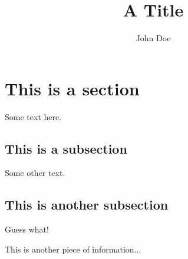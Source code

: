 \documentclass{article}
\title{A Title}
\author{John Doe}
\begin{document}
\maketitle

\section{This is a section}

Some text here.

\subsection{This is a subsection}

Some other text.

\subsection{This is another subsection}

Guess what!

This is another piece of information... %
\end{document}
